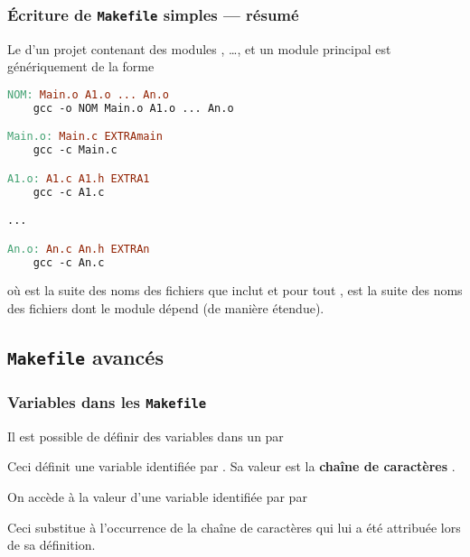 \begin{frame}[fragile]
\frametitle{Écriture de {\tt Makefile} simples --- résumé}
Le  d'un projet contenant des modules , \dots,
 et un module principal  est génériquement de la
forme
\begin{lstlisting}[language=make]
NOM: Main.o A1.o ... An.o
    gcc -o NOM Main.o A1.o ... An.o

Main.o: Main.c EXTRAmain
    gcc -c Main.c

A1.o: A1.c A1.h EXTRA1
    gcc -c A1.c

...

An.o: An.c An.h EXTRAn
    gcc -c An.c
\end{lstlisting}
où  est la suite des noms des fichiers  que
 inclut et pour tout , 
est la suite des noms des fichiers  dont le module 
dépend (de manière étendue).
\end{frame}

\subsection{{\tt Makefile} avancés}

\begin{frame}[fragile]
\frametitle{Variables dans les {\tt Makefile}}
Il est possible de \alert{définir des variables} dans un 
par
\begin{center}\end{center}
Ceci définit une variable identifiée par . Sa valeur est
la {\bf chaîne de caractères} .
\bigskip

On accède à la valeur d'une variable identifiée par  par
\begin{center}\end{center}
Ceci substitue à l'occurrence de  la chaîne de caractères qui
lui a été attribuée lors de sa définition.
\end{frame}

